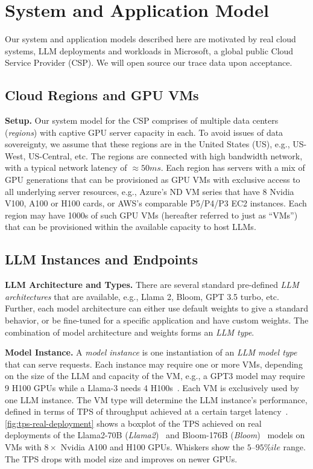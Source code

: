 \section{System and Application Model }
\label{sec:sys-app-model}

Our system and application models described here are motivated by real cloud systems, LLM deployments and workloads in Microsoft, %
a global public Cloud Service Provider (CSP). {We will open source our trace data upon acceptance.}

\subsection{Cloud Regions and GPU VMs}
\textbf{Setup. }Our system model for the CSP comprises of multiple data centers (\textit{regions}) with captive GPU server capacity in each. To avoid issues of data sovereignty, we assume that these regions are in the United States (US), e.g., US-West, US-Central, etc. The regions are connected with high bandwidth network, with a typical network latency of $\approx 50ms$. Each region has servers with a mix of GPU generations that can be provisioned as GPU VMs with exclusive access to all underlying server resources, e.g., Azure's ND VM series that have 8 Nvidia V100, A100 or H100 cards, %
or AWS's comparable P5/P4/P3 EC2 instances.
Each region may have 1000s of such GPU VMs (hereafter referred to just as ``VMs'') that can be provisioned within the available capacity to host LLMs.



\subsection{LLM Instances and Endpoints}
\textbf{LLM Architecture and Types. }There are several standard pre-defined \textit{LLM architectures} that are available, e.g., Llama 2, Bloom, GPT 3.5 turbo, etc.
Further, each model architecture can either use default weights to give a standard behavior, or be fine-tuned for a specific application and have custom weights. The combination of model architecture and weights forms an \textit{LLM type}.

\textbf{Model Instance. }A \textit{model instance} is one instantiation of an \textit{LLM model type} that can serve requests.
Each instance may require one or more VMs,
depending on the size of the LLM and capacity of the VM, e.g., a GPT3 model may require 9 H100 GPUs while a Llama-3 needs 4 H100s~\cite{mei2024helix}. 
Each VM is exclusively used by one LLM instance.
The VM type 
will determine the LLM instance's performance, defined in terms of TPS of throughput achieved at a certain target latency~\cite{mei2024helix}. 
\autoref{fig:tps-real-deployment} shows a boxplot of the TPS achieved on real deployments of the Llama2-70B (\textit{Llama2})~\cite{Llama} and Bloom-176B (\textit{Bloom})~\cite{bloom} models on VMs with $8\times$ Nvidia A100 and H100 GPUs. Whiskers show the $5$--$95\%ile$ range. The TPS drops with model size and improves on newer GPUs. 

